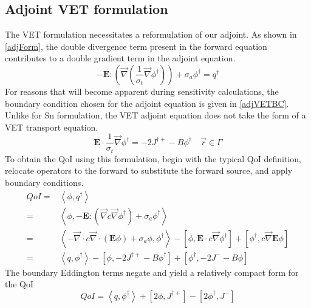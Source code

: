 \documentclass{article}
\newcommand{\vr}{\vec{r}}
\newcommand{\bra}{\left\langle}
\newcommand{\ket}{\right\rangle}
\newcommand{\sbra}{\left[}
\newcommand{\sket}{\right]}
\newcommand{\vdiv}{\vec{\nabla} \cdot}
\newcommand{\vgrad}{\vec{\nabla}}
\newcommand{\Edd}{\mathbf{E}}
\newcommand{\sigt}{\sigma_t}
\newcommand{\siga}{\sigma_a}
\newcommand{\isigt}{c}
\newcommand{\scalSource}{q}
\newcommand{\scalResp}{q^\dag}
\begin{document}
\subsection{Adjoint VET formulation}

The VET formulation necessitates a reformulation of our adjoint. As shown in \ref{adjForm}, the double divergence term present in the forward equation contributes to a double gradient term in the adjoint equation.
\begin{equation}
\label{adjForm}
- \Edd : \left( \vgrad \left( \frac{1}{\sigt}\vgrad \phi^\dag \right) \right) + \siga \phi^\dag = \scalResp
\end{equation}
For reasons that will become apparent during sensitivity calculations, the boundary condition chosen for the adjoint equation is given in \ref{adjVETBC}. Unlike for Sn formulation, the VET adjoint equation does not take the form of a VET transport equation.
\begin{equation}
\label{adjVETBC}
\Edd \cdot \frac{1}{\sigma_{t} } \vec{\nabla} \phi^\dag  = - 2J^{\dag +} - B \phi^\dag \quad \vr \in \Gamma
\end{equation}
To obtain the QoI using this formulation, begin with the typical QoI definition, relocate operators to the forward to substitute the forward source, and apply boundary conditions.
\begin{equation}
\label{VETQoIAdjUnpDeriv}
\begin{split}
QoI=&\bra \phi , \scalResp \ket \\
=&\bra \phi , - \Edd : \left( \vgrad \isigt \vgrad \phi^\dag \right) + \siga \phi^\dag \ket \\
=& \bra - \vdiv \isigt \vdiv \left( \Edd \phi \right) + \siga \phi, \phi^\dag \ket 
- \sbra \phi, \Edd \cdot \isigt \vgrad \phi^\dag \sket  
+ \sbra \phi^\dag, \isigt \vgrad \Edd \phi \sket \\
=&\bra \scalSource , \phi^\dag \ket 
- \sbra \phi , - 2J^{\dag +} - B \phi^\dag \sket + \sbra \phi^\dag, - 2J^- - B \phi  \sket
\end{split}
\end{equation}
The boundary Eddington terms negate and yield a relatively compact form for the QoI
\begin{equation}
\label{VETQoIAdj}
QoI=\bra \scalSource , \phi^\dag \ket 
+ \sbra 2\phi, J^{\dag +} \sket  - \sbra 2\phi^\dag, J^- \sket
\end{equation}
\end{document}
